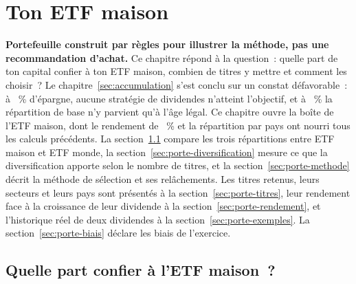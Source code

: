 \section{Ton ETF maison}\label{sec:portefeuille}

\noindent\textbf{Portefeuille construit par r\`egles pour illustrer la m\'ethode, pas une
recommandation d'achat.} Ce chapitre r\'epond \`a la question~: quelle part de ton capital confier \`a
ton ETF maison, combien de titres y mettre et comment les choisir~? Le
chapitre~\ref{sec:accumulation} s'est conclu sur un constat d\'efavorable~: \`a
\SparquoteZwanzig~\% d'\'epargne, aucune strat\'egie de dividendes n'atteint l'objectif, et \`a
\ReferenzSparquote~\% la r\'epartition de base n'y parvient qu'\`a l'\^age l\'egal. Ce chapitre ouvre
la bo\^ite de l'ETF maison, dont le rendement de \RenditeDivMaison~\% et la r\'epartition par pays ont
nourri tous les calculs pr\'ec\'edents. La section~\ref{sec:porte-repartitions} compare les trois
r\'epartitions entre ETF maison et ETF monde, la section~\ref{sec:porte-diversification} mesure ce
que la diversification apporte selon le nombre de titres, et la section~\ref{sec:porte-methode}
d\'ecrit la m\'ethode de s\'election et ses rel\^achements. Les titres retenus, leurs secteurs et leurs
pays sont pr\'esent\'es \`a la section~\ref{sec:porte-titres}, leur rendement face \`a la croissance
de leur dividende \`a la section~\ref{sec:porte-rendement}, et l'historique r\'eel de deux dividendes
\`a la section~\ref{sec:porte-exemples}. La section~\ref{sec:porte-biais} d\'eclare les biais de
l'exercice.

\subsection{Quelle part confier \`a l'ETF maison~?}\label{sec:porte-repartitions}

